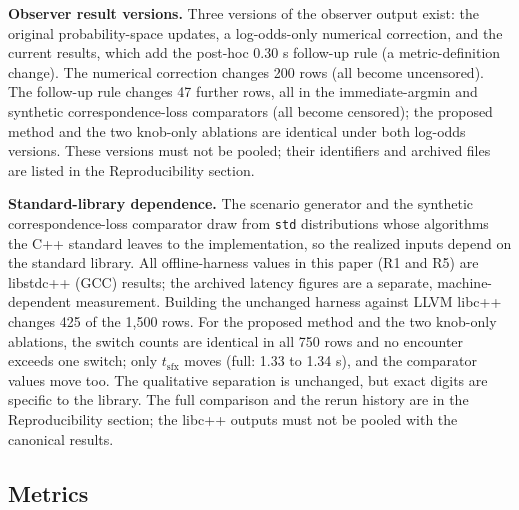 \documentclass[11pt]{article}
\newcommand{\code}[1]{\texttt{#1}}
\begin{document}
\textbf{Observer result versions.} Three versions of the observer output exist: the original probability-space updates, a log-odds-only numerical correction, and the current results, which add the post-hoc 0.30 s follow-up rule (a metric-definition change). The numerical correction changes 200 rows (all become uncensored). The follow-up rule changes 47 further rows, all in the immediate-argmin and synthetic correspondence-loss comparators (all become censored); the proposed method and the two knob-only ablations are identical under both log-odds versions. These versions must not be pooled; their identifiers and archived files are listed in the Reproducibility section.

\textbf{Standard-library dependence.} The scenario generator and the synthetic correspondence-loss comparator draw from \code{std} distributions whose algorithms the C++ standard leaves to the implementation, so the realized inputs depend on the standard library. All offline-harness values in this paper (R1 and R5) are libstdc++ (GCC) results; the archived latency figures are a separate, machine-dependent measurement. Building the unchanged harness against LLVM libc++ changes 425 of the 1,500 rows. For the proposed method and the two knob-only ablations, the switch counts are identical in all 750 rows and no encounter exceeds one switch; only $t_{\text{sfx}}$ moves (full: 1.33 to 1.34 s), and the comparator values move too. The qualitative separation is unchanged, but exact digits are specific to the library. The full comparison and the rerun history are in the Reproducibility section; the libc++ outputs must not be pooled with the canonical results.

\subsection{Metrics}
\end{document}
